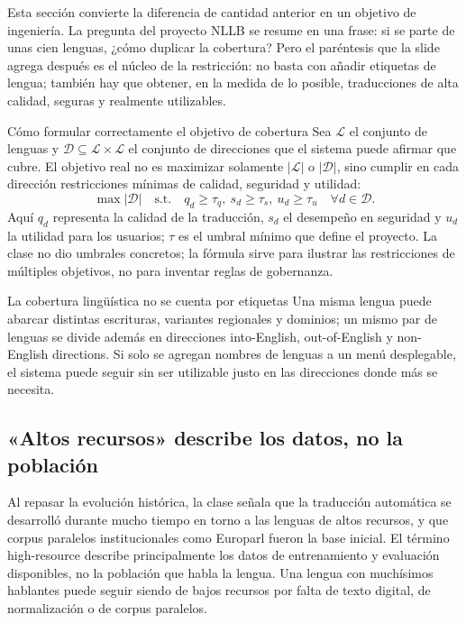 Esta sección convierte la diferencia de cantidad anterior en un objetivo de ingeniería. La pregunta del proyecto NLLB se resume en una frase: si se parte de unas cien lenguas, ¿cómo duplicar la cobertura? Pero el paréntesis que la slide agrega después es el núcleo de la restricción: no basta con añadir etiquetas de lengua; también hay que obtener, en la medida de lo posible, traducciones de alta calidad, seguras y realmente utilizables.


\begin{importantbox}{Cómo formular correctamente el objetivo de cobertura}
Sea $\mathcal{L}$ el conjunto de lenguas y $\mathcal{D}\subseteq\mathcal{L}\times\mathcal{L}$ el conjunto de direcciones que el sistema puede afirmar que cubre. El objetivo real no es maximizar solamente $|\mathcal{L}|$ o $|\mathcal{D}|$, sino cumplir en cada dirección restricciones mínimas de calidad, seguridad y utilidad:
\[
\max |\mathcal{D}|\quad
\text{s.t.}\quad q_d\ge \tau_q,\ s_d\ge \tau_s,\ u_d\ge \tau_u\quad \forall d\in\mathcal{D}.
\]
Aquí $q_d$ representa la calidad de la traducción, $s_d$ el desempeño en seguridad y $u_d$ la utilidad para los usuarios; $\tau$ es el umbral mínimo que define el proyecto. La clase no dio umbrales concretos; la fórmula sirve para ilustrar las restricciones de múltiples objetivos, no para inventar reglas de gobernanza.
\end{importantbox}

\begin{warningbox}{La cobertura lingüística no se cuenta por etiquetas}
Una misma lengua puede abarcar distintas escrituras, variantes regionales y dominios; un mismo par de lenguas se divide además en direcciones into-English, out-of-English y non-English directions. Si solo se agregan nombres de lenguas a un menú desplegable, el sistema puede seguir sin ser utilizable justo en las direcciones donde más se necesita.
\end{warningbox}

\subsection{«Altos recursos» describe los datos, no la población}

Al repasar la evolución histórica, la clase señala que la traducción automática se desarrolló durante mucho tiempo en torno a las lenguas de altos recursos, y que corpus paralelos institucionales como Europarl fueron la base inicial. El término high-resource describe principalmente los datos de entrenamiento y evaluación disponibles, no la población que habla la lengua. Una lengua con muchísimos hablantes puede seguir siendo de bajos recursos por falta de texto digital, de normalización o de corpus paralelos.


